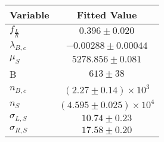 \begin{tabular}[t]{lc}
\hline
Variable &Fitted Value\\
\hline\hline
$f_{\frac{L}{R}}$&$0.396\pm0.020$\\
\hline
$\lambda_{B,c}$&$-0.00288\pm0.00044$\\
\hline
$\mu_S$&$5278.856\pm0.081$\\
\hline
B&$613\pm38$\\
\hline
$n_{B,c}$&$(2.27\pm0.14)\times 10^3$\\
\hline
$n_S$&$(4.595\pm0.025)\times 10^4$\\
\hline
$\sigma_{L, S}$&$10.74\pm0.23$\\
\hline
$\sigma_{R, S}$&$17.58\pm0.20$\\
\hline
\end{tabular}